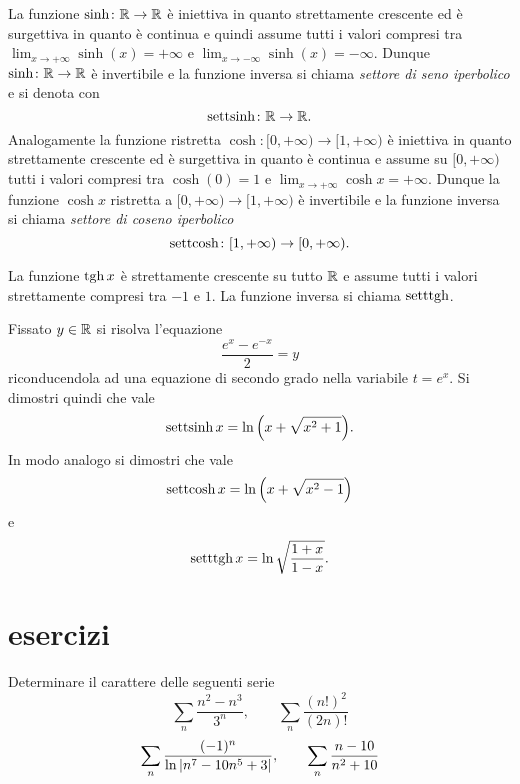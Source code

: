 La funzione $\sinh\colon {\mathbb R}\to{\mathbb R}$ è iniettiva in quanto strettamente crescente ed
è surgettiva in quanto è continua e quindi assume tutti i valori compresi tra
$\lim_{x\to+\infty} \sinh(x) = +\infty$ e $\lim_{x\to -\infty} \sinh(x) = -\infty$. 
Dunque $\sinh\colon {\mathbb R} \to {\mathbb R}$
è invertibile e la funzione inversa si chiama \emph{settore di seno iperbolico}
e si denota con
\mymargin{$\settsinh$}
\[
    \operatorname{settsinh} \colon {\mathbb R} \to {\mathbb R}.
\]
Analogamente la funzione ristretta $\cosh\colon [0,+\infty)\to [1,+\infty)$ è
iniettiva in quanto strettamente crescente ed è surgettiva in quanto
è continua e assume su $[0,+\infty)$ tutti i valori compresi tra $\cosh(0)=1$ e
$\lim_{x\to +\infty} \cosh x = +\infty$.
Dunque la funzione $\cosh x$ ristretta a $[0,+\infty)\to [1,+\infty)$
è invertibile e la funzione inversa si chiama \emph{settore di coseno iperbolico}
\mymargin{$\settcosh$}
\[
    \operatorname{settcosh} \colon [1,+\infty)\to [0,+\infty).
\]

La funzione $\operatorname{tgh} x$ è strettamente crescente su tutto ${\mathbb R}$ e assume tutti i valori strettamente compresi tra $-1$ e $1$.
La funzione inversa si chiama $\operatorname{setttgh}$.

\begin{exercise}
Fissato $y\in {\mathbb R}$ si risolva l'equazione
\[
    \frac{e^x - e^{-x}}{2} = y
\]
riconducendola ad una equazione di secondo grado nella variabile $t=e^x$.
Si dimostri quindi che vale
\[
    \operatorname{settsinh} x = \ln{\left( x + \sqrt{x^2 + 1} \right)}.
\]
In modo analogo si dimostri che vale
\[
    \operatorname{settcosh} x = \ln{\left( x + \sqrt{x^2 - 1} \right)}
\]
e
\[
    \operatorname{setttgh} x = \ln \sqrt{\frac{1+x}{1-x}}.
\]
\end{exercise}


\section{esercizi}
\begin{exercise}
Determinare il carattere delle seguenti serie
\[
    \sum_n \frac{n^2-n^3}{3^n}, \qquad
    \sum_n \frac{(n!)^2}{(2n)!}
\]
\[
\sum_n \frac{(-1)^n}{\ln{\left|n^7 - 10n^5 + 3\right|}},  \qquad
\sum_n \frac{n-10}{n^2+10}
\]
\end{exercise}
  